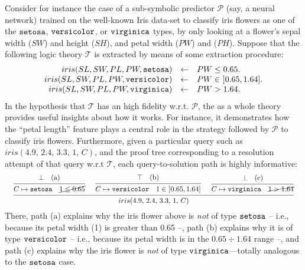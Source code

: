 \documentclass[12pt,a4paper,openright,twoside]{book}
\begin{document}
Consider for instance the case of a sub-symbolic predictor $\mathcal{P}$ (say, a neural network) trained on the well-known Iris data-set to classify iris flowers as one of the $\mathtt{setosa}$, $\mathtt{versicolor}$, or $\mathtt{virginica}$ types, by only looking at a flower's sepal width ($SW$) and height ($SH$), and petal width ($PW$) and ($PH$).
%
Suppose that the following logic theory $\mathcal{T}$ is extracted by means of some extraction procedure:
%
\begin{equation*}
    \begin{array}{rcl}
        iris(SL, SW, PL, PW, \mathtt{setosa}) & \leftarrow & PW \leq 0.65 .
        \\
        iris(SL, SW, PL, PW, \mathtt{versicolor}) & \leftarrow & PW \in\ ]0.65, 1.64] .
        \\
        iris(SL, SW, PL, PW, \mathtt{virginica}) & \leftarrow & PW > 1.64 .
    \end{array}
\end{equation*}
%
In the hypothesis that $\mathcal{T}$ has an high fidelity w.r.t. $\mathcal{P}$, the as a whole theory provides useful insights about how it works.
%
For instance, it demonstrates how the ``petal length'' feature plays a central role in the strategy followed by $\mathcal{P}$ to classify iris flowers.
%
Furthermore, given a particular query such as $iris(4.9,\, 2.4,\, 3.3,\, 1,\, C)$, and the proof tree corresponding to a resolution attempt of that query w.r.t $\mathcal{T}$, each query-to-solution path is highly informative:
%
\begin{equation*}
    \resizebox{\linewidth}{!}{
        \begin{prooftree}
            \hypo{\bot\quad\text{(a)}}
            \infer1{C \mapsto \functor{setosa} \quad \cancel{1 \leq 0.65}}
            \hypo{\top\quad\text{(b)}}
            \infer1{C \mapsto \functor{versicolor} \quad 1 \in\ ]0.65, 1.64]}
            \hypo{\bot\quad\text{(c)}}
            \infer1{C \mapsto \functor{virginica} \quad \cancel{1 > 1.64}}
            \infer3{iris(4.9,\, 2.4,\, 3.3,\, 1,\, C)}
        \end{prooftree}
    }
\end{equation*}
%
There, path (a) explains why the iris flower above is \emph{not} of type $\mathtt{setosa}$ -- i.e., because its petal width (1) is greater than 0.65 --, path (b) explains why it is of type $\mathtt{versicolor}$ -- i.e., because its petal width is in the $0.65\div1.64$ range --, and path (c) explains why the iris flower is \emph{not} of type $\mathtt{virginica}$---totally analogous to the $\mathtt{setosa}$ case.
\end{document}
